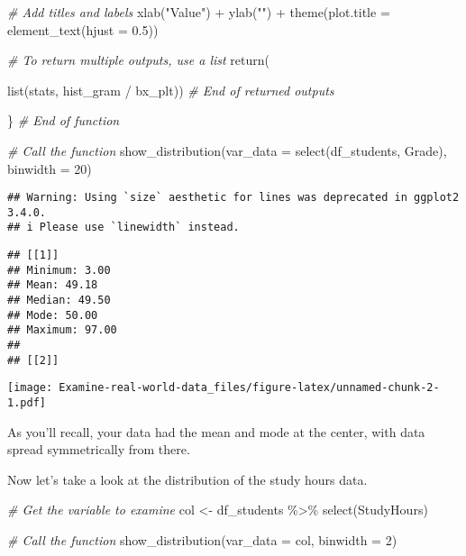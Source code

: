 \documentclass[
]{article}
\newenvironment{Shaded}{\begin{snugshade}}{\end{snugshade}}
\newcommand{\AttributeTok}[1]{\textcolor[rgb]{0.77,0.63,0.00}{#1}}
\newcommand{\CommentTok}[1]{\textcolor[rgb]{0.56,0.35,0.01}{\textit{#1}}}
\newcommand{\DecValTok}[1]{\textcolor[rgb]{0.00,0.00,0.81}{#1}}
\newcommand{\FloatTok}[1]{\textcolor[rgb]{0.00,0.00,0.81}{#1}}
\newcommand{\FunctionTok}[1]{\textcolor[rgb]{0.00,0.00,0.00}{#1}}
\newcommand{\NormalTok}[1]{#1}
\newcommand{\OtherTok}[1]{\textcolor[rgb]{0.56,0.35,0.01}{#1}}
\newcommand{\SpecialCharTok}[1]{\textcolor[rgb]{0.00,0.00,0.00}{#1}}
\newcommand{\StringTok}[1]{\textcolor[rgb]{0.31,0.60,0.02}{#1}}
\begin{document}
\begin{Shaded}
\begin{Highlighting}[]
    \CommentTok{\# Add titles and labels}
  \FunctionTok{xlab}\NormalTok{(}\StringTok{"Value"}\NormalTok{) }\SpecialCharTok{+}
  \FunctionTok{ylab}\NormalTok{(}\StringTok{""}\NormalTok{) }\SpecialCharTok{+}
  \FunctionTok{theme}\NormalTok{(}\AttributeTok{plot.title =} \FunctionTok{element\_text}\NormalTok{(}\AttributeTok{hjust =} \FloatTok{0.5}\NormalTok{))}
  
  
  \CommentTok{\# To return multiple outputs, use a list}
  \FunctionTok{return}\NormalTok{(}
    
    \FunctionTok{list}\NormalTok{(stats,}
\NormalTok{         hist\_gram }\SpecialCharTok{/}\NormalTok{ bx\_plt)) }\CommentTok{\# End of returned outputs}
  
\NormalTok{\} }\CommentTok{\# End of function}


\CommentTok{\# Call the function}
\FunctionTok{show\_distribution}\NormalTok{(}\AttributeTok{var\_data =} \FunctionTok{select}\NormalTok{(df\_students, Grade), }\AttributeTok{binwidth =} \DecValTok{20}\NormalTok{)}
\end{Highlighting}
\end{Shaded}

\begin{verbatim}
## Warning: Using `size` aesthetic for lines was deprecated in ggplot2 3.4.0.
## i Please use `linewidth` instead.
\end{verbatim}

\begin{verbatim}
## [[1]]
## Minimum: 3.00
## Mean: 49.18
## Median: 49.50
## Mode: 50.00
## Maximum: 97.00
## 
## [[2]]
\end{verbatim}

\texttt{[image: Examine-real-world-data\_files/figure-latex/unnamed-chunk-2-1.pdf]}

As you'll recall, your data had the mean and mode at the center, with
data spread symmetrically from there.

Now let's take a look at the distribution of the study hours data.

\begin{Shaded}
\begin{Highlighting}[]
\CommentTok{\# Get the variable to examine}
\NormalTok{col }\OtherTok{\textless{}{-}}\NormalTok{ df\_students }\SpecialCharTok{\%\textgreater{}\%} 
  \FunctionTok{select}\NormalTok{(StudyHours)}

\CommentTok{\# Call the function}
\FunctionTok{show\_distribution}\NormalTok{(}\AttributeTok{var\_data =}\NormalTok{ col, }\AttributeTok{binwidth =} \DecValTok{2}\NormalTok{)}
\end{Highlighting}
\end{Shaded}
\end{document}
